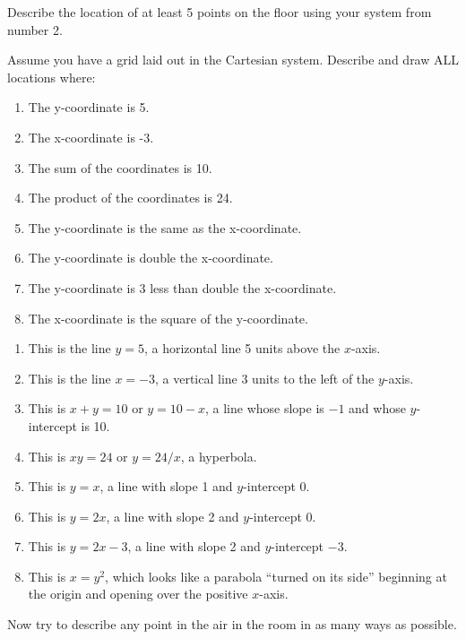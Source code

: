 \documentclass{ximera}
\begin{document}
\begin{problem}
Describe the location of at least 5 points on the floor using your system from number 2.
\end{problem}


\begin{problem}
Assume you have a grid laid out in the Cartesian system.  Describe and draw ALL locations where:
\begin{enumerate}
\item The y-coordinate is 5.
\item The x-coordinate is -3.
\item The sum of the coordinates is 10.
\item The product of the coordinates is 24.
\item The y-coordinate is the same as the x-coordinate.
\item The y-coordinate is double the x-coordinate.
\item The y-coordinate is 3 less than double the x-coordinate.
\item The x-coordinate is the square of the y-coordinate.
\end{enumerate}

\begin{solution}
    \begin{enumerate}
    \item This is the line $y = 5$, a horizontal line 5 units above the $x$-axis.
    \item This is the line $x = -3$, a vertical line 3 units to the left of the $y$-axis.
    \item This is $x + y = 10$ or $y = 10-x$, a line whose slope is $-1$ and whose $y$-intercept is 10.
    \item This is $xy = 24$ or $y = 24/x$, a hyperbola.
    \item This is $y = x$, a line with slope 1 and $y$-intercept 0.
    \item This is $y = 2x$, a line with slope 2 and $y$-intercept 0.
    \item This is $y = 2x-3$, a line with slope 2 and $y$-intercept $-3$.
    \item This is $x = y^2$, which looks like a parabola ``turned on its side'' beginning at the origin and opening over the positive $x$-axis.
    \end{enumerate}
\end{solution}
\end{problem}

\begin{problem}
Now try to describe any point in the air in the room in as many ways as possible.
\end{problem}
\end{document}
